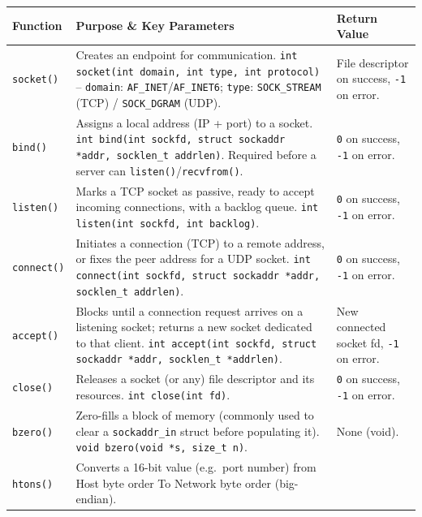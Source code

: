 \documentclass[11pt]{article}
\begin{document}
\begin{longtable}{p{2.6cm}p{6.3cm}p{5.3cm}}
\toprule
\textbf{Function} & \textbf{Purpose \& Key Parameters} & \textbf{Return Value} \\
\midrule
\endhead
\texttt{socket()} & Creates an endpoint for communication. \newline
\texttt{int socket(int domain, int type, int protocol)} -- \texttt{domain}: \texttt{AF\_INET}/\texttt{AF\_INET6}; \texttt{type}: \texttt{SOCK\_STREAM} (TCP) / \texttt{SOCK\_DGRAM} (UDP). &
File descriptor on success, \texttt{-1} on error. \\
\texttt{bind()} & Assigns a local address (IP + port) to a socket. \newline
\texttt{int bind(int sockfd, struct sockaddr *addr, socklen\_t addrlen)}. Required before a server can \texttt{listen()}/\texttt{recvfrom()}. &
\texttt{0} on success, \texttt{-1} on error. \\
\texttt{listen()} & Marks a TCP socket as passive, ready to accept incoming connections, with a backlog queue. \newline
\texttt{int listen(int sockfd, int backlog)}. &
\texttt{0} on success, \texttt{-1} on error. \\
\texttt{connect()} & Initiates a connection (TCP) to a remote address, or fixes the peer address for a UDP socket. \newline
\texttt{int connect(int sockfd, struct sockaddr *addr, socklen\_t addrlen)}. &
\texttt{0} on success, \texttt{-1} on error. \\
\texttt{accept()} & Blocks until a connection request arrives on a listening socket; returns a new socket dedicated to that client. \newline
\texttt{int accept(int sockfd, struct sockaddr *addr, socklen\_t *addrlen)}. &
New connected socket fd, \texttt{-1} on error. \\
\texttt{close()} & Releases a socket (or any) file descriptor and its resources. \newline
\texttt{int close(int fd)}. &
\texttt{0} on success, \texttt{-1} on error. \\
\texttt{bzero()} & Zero-fills a block of memory (commonly used to clear a \texttt{sockaddr\_in} struct before populating it). \newline
\texttt{void bzero(void *s, size\_t n)}. &
None (void). \\
\texttt{htons()} & Converts a 16-bit value (e.g.\ port number) from Host byte order To Network byte order (big-endian). \newline

\end{longtable}
\end{document}
